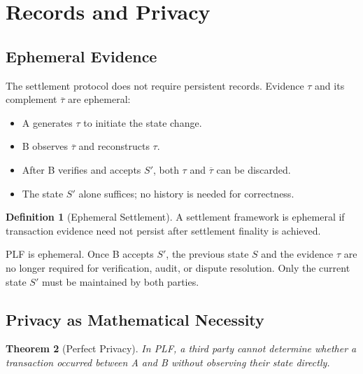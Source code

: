 \documentclass[twocolumn,10pt,a4paper]{article}
\theoremstyle{plain}
\newtheorem{theorem}{Theorem}[section]
\theoremstyle{definition}
\newtheorem{definition}[theorem]{Definition}
\newcommand{\comp}[1]{\overline{#1}}
\begin{document}
\section{Records and Privacy}
\label{sec:records}

\subsection{Ephemeral Evidence}

The settlement protocol does not require persistent records. Evidence $\tau$ and its complement $\comp{\tau}$ are ephemeral:
\begin{itemize}
\item A generates $\tau$ to initiate the state change.
\item B observes $\comp{\tau}$ and reconstructs $\tau$.
\item After B verifies and accepts $S'$, both $\tau$ and $\comp{\tau}$ can be discarded.
\item The state $S'$ alone suffices; no history is needed for correctness.
\end{itemize}

\begin{definition}[Ephemeral Settlement]
A settlement framework is ephemeral if transaction evidence need not persist after settlement finality is achieved.
\end{definition}

PLF is ephemeral. Once B accepts $S'$, the previous state $S$ and the evidence $\tau$ are no longer required for verification, audit, or dispute resolution. Only the current state $S'$ must be maintained by both parties.

\subsection{Privacy as Mathematical Necessity}

\begin{theorem}[Perfect Privacy]
In PLF, a third party cannot determine whether a transaction occurred between A and B without observing their state directly.
\end{theorem}
\end{document}
